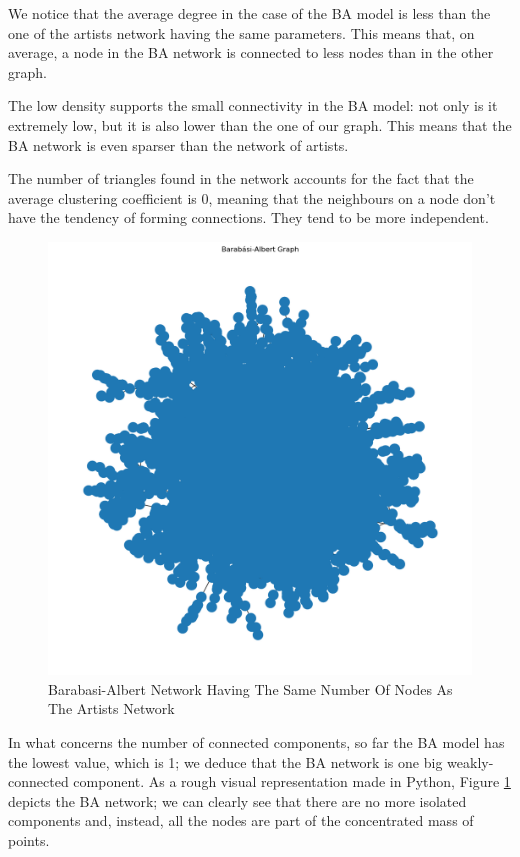 \documentclass[sigchi]{acmart}
\begin{document}
We notice that the average degree in the case of the BA model is less than the one of the artists network having the same parameters. This means that, on average, a node in the BA network is connected to less nodes than in the other graph. 

The low density supports the small connectivity in the BA model: not only is it extremely low, but it is also lower than the one of our graph. This means that the BA network is even sparser than the network of artists.

The number of triangles found in the network accounts for the fact that the average clustering coefficient is 0, meaning that the neighbours on a node don't have the tendency of forming connections. They tend to be more independent.

\begin{figure}[h!]
  \centering
  \includegraphics[width=\linewidth]{img/BA_graph.png}
  \caption{Barabasi-Albert Network Having The Same Number Of Nodes As The Artists Network}
  \label{fig:BA-network}
\end{figure}

In what concerns the number of connected components, so far the BA model has the lowest value, which is 1; we deduce that the BA network is one big weakly-connected component. As a rough visual representation made in Python, Figure \ref{fig:BA-network} depicts the BA network; we can clearly see that there are no more isolated components and, instead, all the nodes are part of the concentrated mass of points.
\end{document}
